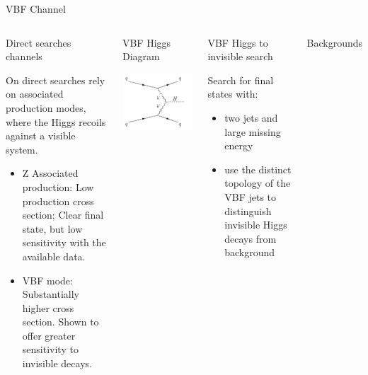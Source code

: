 \documentclass[8pt]{beamer}
\begin{document}
\begin{frame}{VBF Channel}

\begin{columns}
 
\begin{block}{Direct searches channels}

On direct searches rely on associated production modes, where the Higgs recoils against a visible system.
\begin{itemize}
 \item Z Associated production: Low production cross section; Clear final state, but low sensitivity with the available data.
 \item VBF mode: Substantially higher cross section. Shown to offer greater sensitivity to invisible decays.
\end{itemize}

\end{block}

\begin{block}{VBF Higgs Diagram}
 
\centering
\includegraphics[width=0.45\linewidth]{img/feyn_VBF.pdf} 

\end{block}

\begin{block}{VBF Higgs to invisible search}

Search for final states with:
\begin{itemize}
 \item two jets and large missing energy
 \item use the distinct topology of the VBF jets to distinguish invisible Higgs decays from background
\end{itemize}
 
\end{block}

\begin{block}{Backgrounds}


\end{block}
\end{columns}
\end{frame}
\end{document}

